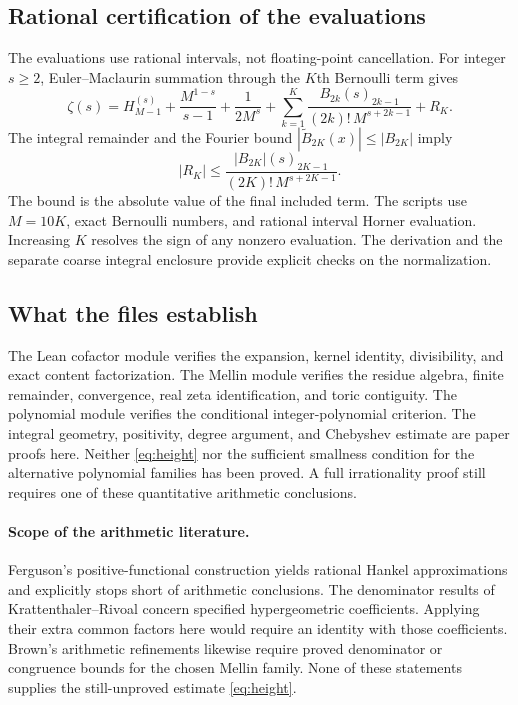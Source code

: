 \documentclass[11pt]{article}
\begin{document}
\subsection{Rational certification of the evaluations}
The evaluations use rational intervals, not floating-point cancellation.
For integer $s\ge2$, Euler--Maclaurin summation through the $K$th
Bernoulli term gives
\[
 \zeta(s)=H_{M-1}^{(s)}+\frac{M^{1-s}}{s-1}+\frac1{2M^s}
 +\sum_{k=1}^K
    \frac{B_{2k}(s)_{2k-1}}{(2k)!\,M^{s+2k-1}}+R_K .
\]
The integral remainder and the Fourier bound
$|\widetilde B_{2K}(x)|\le |B_{2K}|$ imply
\[
 |R_K|\le
 \frac{|B_{2K}|(s)_{2K-1}}{(2K)!\,M^{s+2K-1}}.
\]
The bound is the absolute value of the final included term.
The scripts use $M=10K$, exact Bernoulli numbers, and rational interval
Horner evaluation. Increasing $K$ resolves the sign of any nonzero evaluation.
The derivation and the separate coarse integral enclosure provide
explicit checks on the normalization.

\subsection{What the files establish}
The Lean cofactor module verifies the expansion, kernel identity,
divisibility, and exact content factorization. The Mellin module verifies
the residue algebra, finite remainder, convergence, real zeta
identification, and toric contiguity. The polynomial module verifies
the conditional integer-polynomial criterion.
The integral geometry, positivity, degree argument, and Chebyshev
estimate are paper proofs here.
Neither \eqref{eq:height} nor the sufficient smallness condition for
the alternative polynomial families has been proved.
A full irrationality proof still requires one of these quantitative
arithmetic conclusions.

\paragraph{Scope of the arithmetic literature.}
Ferguson's positive-functional construction \cite{Ferguson} yields rational
Hankel approximations and explicitly stops short of arithmetic conclusions.
The denominator results of Krattenthaler--Rivoal \cite{KR} concern
specified hypergeometric coefficients. Applying their extra common
factors here would require an identity with those coefficients.
Brown's arithmetic refinements \cite{Brown} likewise require proved
denominator or congruence bounds for the chosen Mellin family. None of
these statements supplies the still-unproved estimate \eqref{eq:height}.
\end{document}
